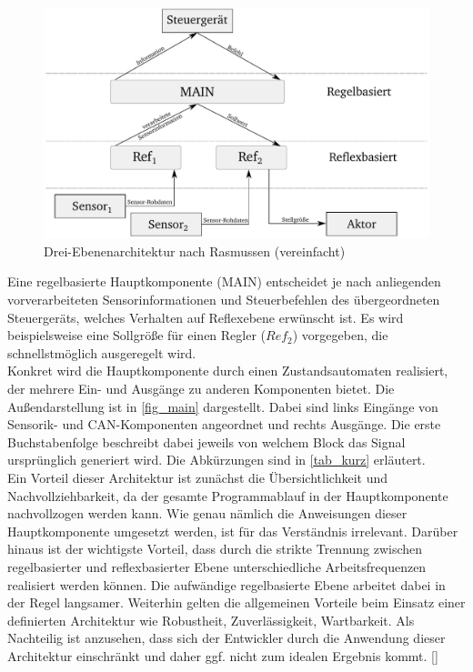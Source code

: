 \begin{figure}%
\centering
\includegraphics[width=0.8\columnwidth]{./Bilder/fig_arch}%
\caption{Drei-Ebenenarchitektur nach Rasmussen (vereinfacht)}%
\label{fig_arch}%
\end{figure}
Eine regelbasierte Hauptkomponente (MAIN) entscheidet je nach anliegenden vorverarbeiteten Sensorinformationen und Steuerbefehlen des übergeordneten Steuergeräts, welches Verhalten auf Reflexebene erwünscht ist. Es wird beispielsweise eine Sollgröße für einen Regler ($Ref_{2}$) vorgegeben, die schnellstmöglich ausgeregelt wird. \\
Konkret wird die Hauptkomponente durch einen Zustandsautomaten realisiert, der mehrere Ein- und Ausgänge zu anderen Komponenten bietet. Die Außendarstellung ist in \autoref{fig_main} dargestellt. Dabei sind links Eingänge von Sensorik- und CAN-Komponenten angeordnet und rechts Ausgänge. Die erste Buchstabenfolge beschreibt dabei jeweils von welchem Block das Signal ursprünglich generiert wird. Die Abkürzungen sind in \autoref{tab_kurz} erläutert. \\
Ein Vorteil dieser Architektur ist zunächst die Übersichtlichkeit und Nachvollziehbarkeit, da der gesamte Programmablauf in der Hauptkomponente nachvollzogen werden kann. Wie genau nämlich die Anweisungen dieser Hauptkomponente umgesetzt werden, ist für das Verständnis irrelevant. Darüber hinaus ist der wichtigste Vorteil, dass durch die strikte Trennung zwischen regelbasierter und reflexbasierter Ebene unterschiedliche Arbeitsfrequenzen realisiert werden können. Die aufwändige regelbasierte Ebene arbeitet dabei in der Regel langsamer. Weiterhin gelten die allgemeinen Vorteile beim Einsatz einer definierten Architektur wie Robustheit, Zuverlässigkeit, Wartbarkeit. Als Nachteilig ist anzusehen, dass sich der Entwickler durch die Anwendung dieser Architektur einschränkt und daher ggf. nicht zum idealen Ergebnis kommt. \autoref{} \\
